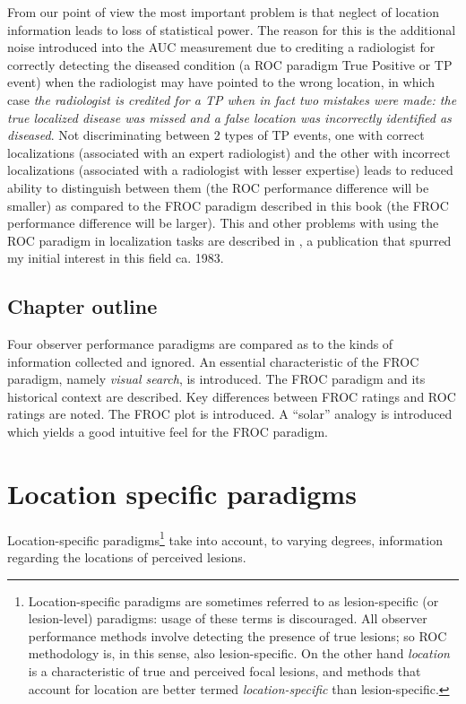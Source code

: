 \documentclass[
]{book}
\begin{document}
From our point of view the most important problem is that neglect of location information leads to loss of statistical power. The reason for this is the additional noise introduced into the AUC measurement due to crediting a radiologist for correctly detecting the diseased condition (a ROC paradigm True Positive or TP event) when the radiologist may have pointed to the wrong location, in which case \emph{the radiologist is credited for a TP when in fact two mistakes were made: the true localized disease was missed and a false location was incorrectly identified as diseased}. Not discriminating between 2 types of TP events, one with correct localizations (associated with an expert radiologist) and the other with incorrect localizations (associated with a radiologist with lesser expertise) leads to reduced ability to distinguish between them (the ROC performance difference will be smaller) as compared to the FROC paradigm described in this book (the FROC performance difference will be larger). This and other problems with using the ROC paradigm in localization tasks are described in \citep{bunch1977free}, a publication that spurred my initial interest in this field \citep{Chakraborty1986DigitalVsConv} ca. 1983.

\hypertarget{froc-paradigm-outline}{%
\subsection{Chapter outline}\label{froc-paradigm-outline}}

Four observer performance paradigms are compared as to the kinds of information collected and ignored. An essential characteristic of the FROC paradigm, namely \emph{visual search}, is introduced. The FROC paradigm and its historical context are described. Key differences between FROC ratings and ROC ratings are noted. The FROC plot is introduced. A ``solar'' analogy is introduced which yields a good intuitive feel for the FROC paradigm.

\hypertarget{froc-paradigm-location-specific-paradigms}{%
\section{Location specific paradigms}\label{froc-paradigm-location-specific-paradigms}}

Location-specific paradigms\footnote{Location-specific paradigms are sometimes referred to as lesion-specific (or lesion-level) paradigms: usage of these terms is discouraged. All observer performance methods involve detecting the presence of true lesions; so ROC methodology is, in this sense, also lesion-specific. On the other hand \emph{location} is a characteristic of true and perceived focal lesions, and methods that account for location are better termed \emph{location-specific} than lesion-specific.} take into account, to varying degrees, information regarding the locations of perceived lesions.
\end{document}
